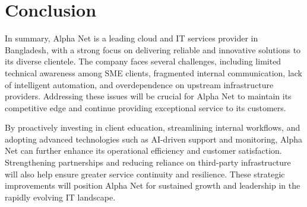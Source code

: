 \section{Conclusion}
In summary, Alpha Net is a leading cloud and IT services provider in Bangladesh, with a strong focus on delivering reliable and innovative solutions to its diverse clientele. The company faces several challenges, including limited technical awareness among SME clients, fragmented internal communication, lack of intelligent automation, and overdependence on upstream infrastructure providers. Addressing these issues will be crucial for Alpha Net to maintain its competitive edge and continue providing exceptional service to its customers.

By proactively investing in client education, streamlining internal workflows, and adopting advanced technologies such as AI-driven support and monitoring, Alpha Net can further enhance its operational efficiency and customer satisfaction. Strengthening partnerships and reducing reliance on third-party infrastructure will also help ensure greater service continuity and resilience. These strategic improvements will position Alpha Net for sustained growth and leadership in the rapidly evolving IT landscape.

